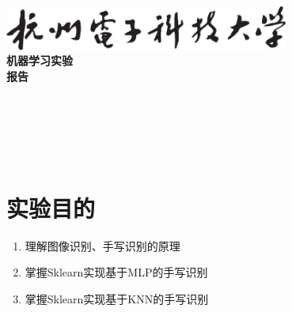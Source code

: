 \documentclass[a4paper]{ctexart}
\begin{document}
  \begin{titlepage}
      \songti
      \begin{center}
        \vspace*{2cm}
        \includegraphics[width=0.7\textwidth]{../HDU.png}\\
        \vspace*{1cm}
        {\fontsize{36pt}{0}
          \textbf{机器学习实验\\报\quad 告\\}
        }
        \vspace*{12cm}
        {\fontsize{18pt}{0}
           \underline{}\\
          \vspace*{0.5cm}
           \underline{}\\
          \vspace*{0.5cm}
           \underline{}\\
          \vspace*{0.5cm}
           \underline{}\\
          \vspace*{0.5cm}
           \underline{}\\
        }
      \end{center}
  \end{titlepage}


  \newpage
  \section{实验目的}
  \begin{enumerate}
    \item 理解图像识别、手写识别的原理
    \item 掌握Sklearn实现基于MLP的手写识别
    \item 掌握Sklearn实现基于KNN的手写识别
  \end{enumerate}
\end{document}
